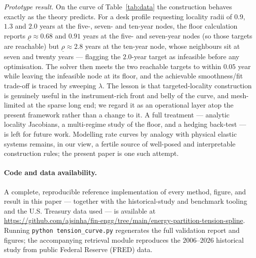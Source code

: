 \documentclass[]{interact}
\theoremstyle{plain}
\begin{document}
\emph{Prototype result.} On the curve of Table~\ref{tab:data} the construction behaves exactly as
the theory predicts. For a desk profile requesting locality radii of $0.9$, $1.3$ and $2.0$ years
at the five-, seven- and ten-year nodes, the floor calculation reports $\underline{\rho}\approx
0.68$ and $0.91$ years at the five- and seven-year nodes (so those targets are reachable) but
$\underline{\rho}\approx 2.8$ years at the ten-year node, whose neighbours sit at seven and twenty
years --- flagging the $2.0$-year target as infeasible before any optimisation. The solver then
meets the two reachable targets to within $0.05$ year while leaving the infeasible node at its
floor, and the achievable smoothness/fit trade-off is traced by sweeping $\lambda$. The lesson is
that targeted-locality construction is genuinely useful in the instrument-rich front and belly of
the curve, and mesh-limited at the sparse long end; we regard it as an operational layer atop the
present framework rather than a change to it. A full treatment --- analytic locality Jacobians, a
multi-regime study of the floor, and a hedging back-test --- is left for future work. Modelling
rate curves by analogy with
physical elastic systems remains, in our view, a fertile source of well-posed and
interpretable construction rules; the present paper is one such attempt.

\paragraph{Code and data availability.} A complete, reproducible reference implementation of every
method, figure, and result in this paper --- together with the historical-study and benchmark
tooling and the U.S. Treasury data used --- is available at
\url{https://github.com/ajsinha/fin-engg/tree/main/energy-partition-tension-spline}.
Running \texttt{python tension\_curve.py} regenerates the full validation report and figures; the
accompanying retrieval module reproduces the $2006$--$2026$ historical study from public Federal
Reserve (FRED) data.

\appendix
\end{document}
